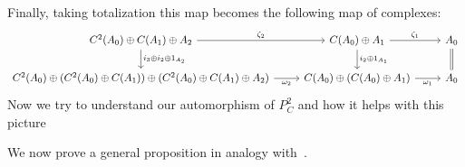 Finally, taking totalization this map becomes the following map of complexes:
\[\begin{tikzcd}
	{C^2(A_0)\oplus C(A_1)\oplus A_2} & {C(A_0)\oplus A_1} & {A_0} \\
	{C^2(A_0)\oplus (C^2(A_0)\oplus C(A_1))\oplus (C^2(A_0)\oplus C(A_1)\oplus A_2)} & {C(A_0)\oplus (C(A_0)\oplus A_1)} & {A_0}
	\arrow[Rightarrow, no head, from=1-3, to=2-3]
	\arrow["{\zeta_1}", from=1-2, to=1-3]
	\arrow["{\omega_1}"', from=2-2, to=2-3]
	\arrow["{i_2\oplus 1_{A_1}}", from=1-2, to=2-2]
	\arrow["{\omega_2}"', from=2-1, to=2-2]
	\arrow["{\zeta_2}", from=1-1, to=1-2]
	\arrow["{i_3\oplus i_2\oplus 1_{A_2}}", from=1-1, to=2-1]
\end{tikzcd}\]
Now we try to understand our automorphism of $P_C^2$ and how it helps with this picture



We now prove a general proposition in analogy with~\cite[Prop 4.5]{BJORT}.

